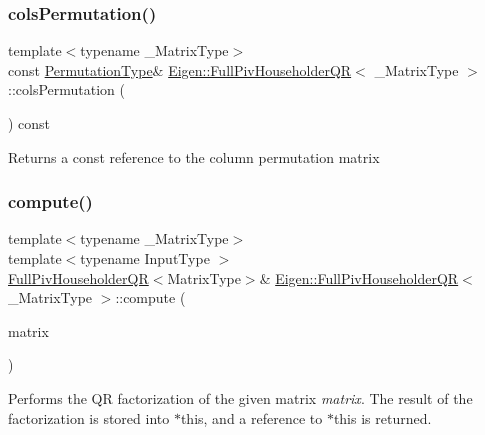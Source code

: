 \subsubsection{\texorpdfstring{colsPermutation()}{colsPermutation()}}
{\footnotesize\ttfamily template$<$typename \+\_\+\+Matrix\+Type$>$ \\
const \mbox{\hyperlink{class_eigen_1_1_permutation_matrix}{Permutation\+Type}}\& \mbox{\hyperlink{class_eigen_1_1_full_piv_householder_q_r}{Eigen\+::\+Full\+Piv\+Householder\+QR}}$<$ \+\_\+\+Matrix\+Type $>$\+::cols\+Permutation (\begin{DoxyParamCaption}{ }\end{DoxyParamCaption}) const\hspace{0.3cm}{\ttfamily [inline]}}

\begin{DoxyReturn}{Returns}
a const reference to the column permutation matrix 
\end{DoxyReturn}
\mbox{\label{class_eigen_1_1_full_piv_householder_q_r_a3745d70b826c12d33b8d34f26a5c96e7}} 
\subsubsection{\texorpdfstring{compute()}{compute()}}
{\footnotesize\ttfamily template$<$typename \+\_\+\+Matrix\+Type$>$ \\
template$<$typename Input\+Type $>$ \\
\mbox{\hyperlink{class_eigen_1_1_full_piv_householder_q_r}{Full\+Piv\+Householder\+QR}}$<$Matrix\+Type$>$\& \mbox{\hyperlink{class_eigen_1_1_full_piv_householder_q_r}{Eigen\+::\+Full\+Piv\+Householder\+QR}}$<$ \+\_\+\+Matrix\+Type $>$\+::compute (\begin{DoxyParamCaption}\item[{const \mbox{\hyperlink{struct_eigen_1_1_eigen_base}{Eigen\+Base}}$<$ Input\+Type $>$ \&}]{matrix }\end{DoxyParamCaption})}

Performs the QR factorization of the given matrix {\itshape matrix}. The result of the factorization is stored into {\ttfamily $\ast$this}, and a reference to {\ttfamily $\ast$this} is returned.

